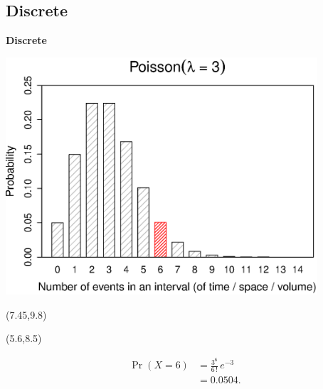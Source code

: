 \documentclass[compress]{beamer}        %
\makeatletter
\newcommand{\tcb}{\textcolor{beamer@blendedblue}}
\makeatother
\begin{document}
\subsection{Discrete}
\begin{frame}{\bf \tcb{Discrete}\\[-1.1cm]}
\begin{center}
\includegraphics[width=0.87\textwidth, trim = 0.0cm 0.5cm 0.3cm 0.5cm, clip]{Poisson}
\end{center}
\begin{textblock}{1}(7.45,9.8)
\xymatrixcolsep{1cm}
\end{textblock}
\begin{textblock}{10}(5.6,8.5)
\begin{scriptsize}
\begin{align*}
\Pr(X=6) &= \frac{3^6}{6\,!}\,e^{-3}\\
&= 0.0504.
\end{align*}
\end{scriptsize}
\end{textblock}
\end{frame}
\end{document}
